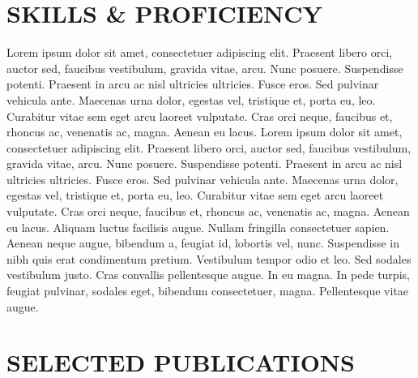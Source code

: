 \documentclass[9pt,leftSidebar]{orbit-cv}
\begin{document}
\section{\faRocket{} SKILLS \& PROFICIENCY}
Lorem ipsum dolor sit amet, consectetuer adipiscing elit. Praesent libero orci, auctor sed, faucibus vestibulum, gravida vitae, arcu. Nunc posuere. Suspendisse potenti. Praesent in arcu ac nisl ultricies ultricies. Fusce eros. Sed pulvinar vehicula ante. Maecenas urna dolor, egestas vel, tristique et, porta eu, leo. Curabitur vitae sem eget arcu laoreet vulputate. Cras orci neque, faucibus et, rhoncus ac, venenatis ac, magna. Aenean eu lacus. 
Lorem ipsum dolor sit amet, consectetuer adipiscing elit. Praesent libero orci, auctor sed, faucibus vestibulum, gravida vitae, arcu. Nunc posuere. Suspendisse potenti. Praesent in arcu ac nisl ultricies ultricies. Fusce eros. Sed pulvinar vehicula ante. Maecenas urna dolor, egestas vel, tristique et, porta eu, leo. Curabitur vitae sem eget arcu laoreet vulputate. Cras orci neque, faucibus et, rhoncus ac, venenatis ac, magna. Aenean eu lacus. Aliquam luctus facilisis augue. Nullam fringilla consectetuer sapien. Aenean neque augue, bibendum a, feugiat id, lobortis vel, nunc. Suspendisse in nibh quis erat condimentum pretium. Vestibulum tempor odio et leo. Sed sodales vestibulum justo. Cras convallis pellentesque augue. In eu magna. In pede turpis, feugiat pulvinar, sodales eget, bibendum consectetuer, magna. Pellentesque vitae augue.
\ListSkills{}
%


\section{\faBook{} SELECTED PUBLICATIONS}






\end{document}

